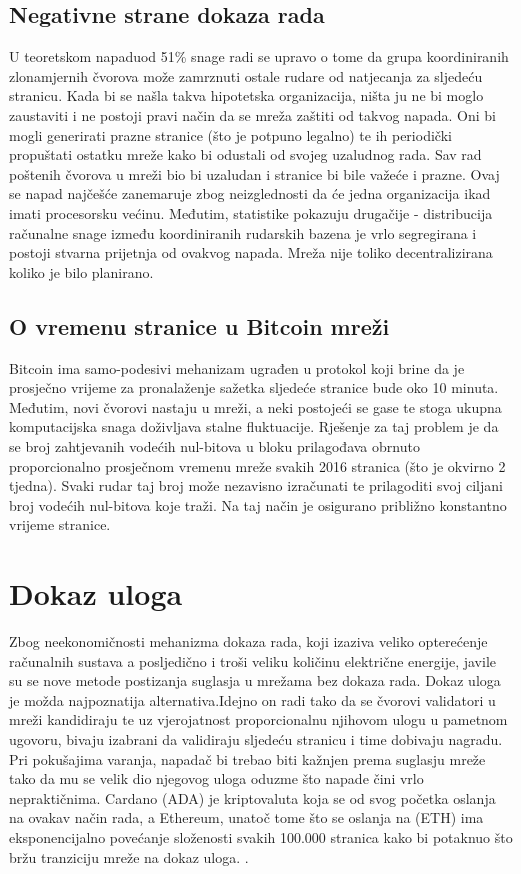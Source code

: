 \documentclass[utf8, zavrsni]{fer}
\begin{document}
\subsection{Negativne strane dokaza rada}
U teoretskom napadu\footnotemark od 51\% snage radi se upravo o tome da grupa koordiniranih zlonamjernih čvorova može zamrznuti ostale rudare od natjecanja za sljedeću stranicu. Kada bi se našla takva hipotetska organizacija, ništa ju ne bi moglo zaustaviti i ne postoji pravi način da se mreža zaštiti od takvog napada. Oni bi mogli generirati prazne stranice (što je potpuno legalno) te ih periodički propuštati ostatku mreže kako bi odustali od svojeg uzaludnog rada. Sav rad poštenih čvorova u mreži bio bi uzaludan i stranice bi bile važeće i prazne. Ovaj se napad najčešće zanemaruje zbog neizglednosti da će jedna organizacija ikad imati procesorsku većinu. Međutim, statistike pokazuju drugačije - distribucija računalne snage između koordiniranih rudarskih bazena je vrlo segregirana i postoji stvarna prijetnja od ovakvog napada. Mreža nije toliko decentralizirana koliko je bilo planirano.

\subsection{O vremenu stranice u Bitcoin mreži}
Bitcoin ima samo-podesivi mehanizam ugrađen u protokol koji brine da je prosječno vrijeme za pronalaženje sažetka sljedeće stranice bude oko 10 minuta. Međutim, novi čvorovi nastaju u mreži, a neki postojeći se gase te stoga ukupna komputacijska snaga doživljava stalne fluktuacije. Rješenje za taj problem je da se broj zahtjevanih vodećih nul-bitova u bloku prilagođava obrnuto proporcionalno prosječnom vremenu mreže svakih 2016 stranica (što je okvirno 2 tjedna). Svaki rudar taj broj može nezavisno izračunati te prilagoditi svoj ciljani broj vodećih nul-bitova koje traži. Na taj način je osigurano približno konstantno vrijeme stranice. 

\section{Dokaz uloga}
Zbog neekonomičnosti mehanizma dokaza rada, koji izaziva veliko opterećenje računalnih sustava a posljedično i troši veliku količinu električne energije, javile su se nove metode postizanja suglasja u mrežama bez dokaza rada. Dokaz uloga\footnotemark {}
je možda najpoznatija alternativa.Idejno on radi tako da se čvorovi validatori u mreži kandidiraju te uz vjerojatnost proporcionalnu njihovom ulogu u pametnom ugovoru, bivaju izabrani da validiraju sljedeću stranicu i time dobivaju nagradu. Pri pokušajima varanja, napadač bi trebao biti kažnjen prema suglasju mreže tako da mu se velik dio njegovog uloga oduzme što napade čini vrlo nepraktičnima. Cardano (ADA)\footnotemark \footnotetext{} je kriptovaluta koja se od svog početka oslanja na ovakav način rada, a Ethereum, unatoč tome što se oslanja na  (ETH) ima eksponencijalno povećanje složenosti svakih 100.000 stranica kako bi potaknuo što bržu tranziciju mreže na dokaz uloga. \cite{wood2014ethereum}.
\end{document}
